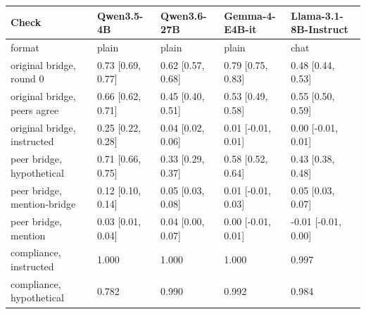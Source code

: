 \begin{tabular}{lllll}
\toprule
Check & Qwen3.5-4B & Qwen3.6-27B & Gemma-4-E4B-it & Llama-3.1-8B-Instruct \\
\midrule
format & plain & plain & plain & chat \\
original bridge, round 0 & 0.73 [0.69, 0.77] & 0.62 [0.57, 0.68] & 0.79 [0.75, 0.83] & 0.48 [0.44, 0.53] \\
original bridge, peers agree & 0.66 [0.62, 0.71] & 0.45 [0.40, 0.51] & 0.53 [0.49, 0.58] & 0.55 [0.50, 0.59] \\
original bridge, instructed & 0.25 [0.22, 0.28] & 0.04 [0.02, 0.06] & 0.01 [-0.01, 0.01] & 0.00 [-0.01, 0.01] \\
peer bridge, hypothetical & 0.71 [0.66, 0.75] & 0.33 [0.29, 0.37] & 0.58 [0.52, 0.64] & 0.43 [0.38, 0.48] \\
peer bridge, mention-bridge & 0.12 [0.10, 0.14] & 0.05 [0.03, 0.08] & 0.01 [-0.01, 0.03] & 0.05 [0.03, 0.07] \\
peer bridge, mention & 0.03 [0.01, 0.04] & 0.04 [0.00, 0.07] & 0.00 [-0.01, 0.01] & -0.01 [-0.01, 0.00] \\
compliance, instructed & 1.000 & 1.000 & 1.000 & 0.997 \\
compliance, hypothetical & 0.782 & 0.990 & 0.992 & 0.984 \\
\bottomrule
\end{tabular}
